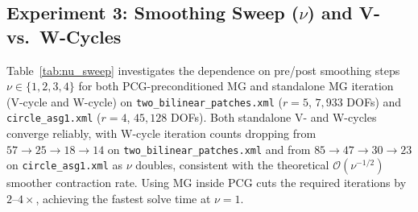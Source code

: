 \documentclass[11pt,a4paper]{article}
\begin{document}
\subsection{Experiment 3: Smoothing Sweep ($\nu$) and V- vs.\ W-Cycles}
Table~\ref{tab:nu_sweep} investigates the dependence on pre/post smoothing steps $\nu \in \{1, 2, 3, 4\}$ for both PCG-preconditioned MG and standalone MG iteration (V-cycle and W-cycle) on \texttt{two\_bilinear\_patches.xml} ($r=5$, $7{,}933$ DOFs) and \texttt{circle\_asg1.xml} ($r=4$, $45{,}128$ DOFs). Both standalone V- and W-cycles converge reliably, with W-cycle iteration counts dropping from $57 \to 25 \to 18 \to 14$ on \texttt{two\_bilinear\_patches.xml} and from $85 \to 47 \to 30 \to 23$ on \texttt{circle\_asg1.xml} as $\nu$ doubles, consistent with the theoretical $\mathcal{O}(\nu^{-1/2})$ smoother contraction rate. Using MG inside PCG cuts the required iterations by $2$--$4\times$, achieving the fastest solve time at $\nu = 1$.
\end{document}
